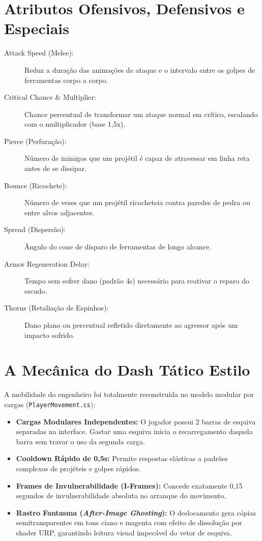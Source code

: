 \documentclass[a4paper,12pt]{report}
\begin{document}
\section{Atributos Ofensivos, Defensivos e Especiais}
\begin{description}
    \item[Attack Speed (Melee):] Reduz a duração das animações de ataque e o intervalo entre os golpes de ferramentas corpo a corpo.
    \item[Critical Chance \& Multiplier:] Chance percentual de transformar um ataque normal em crítico, escalando com o multiplicador (base 1,5x).
    \item[Pierce (Perfuração):] Número de inimigos que um projétil é capaz de atravessar em linha reta antes de se dissipar.
    \item[Bounce (Ricochete):] Número de vezes que um projétil ricocheteia contra paredes de pedra ou entre alvos adjacentes.
    \item[Spread (Dispersão):] Ângulo do cone de disparo de ferramentas de longo alcance.
    \item[Armor Regeneration Delay:] Tempo sem sofrer dano (padrão 4s) necessário para reativar o reparo do escudo.
    \item[Thorns (Retaliação de Espinhos):] Dano plano ou percentual refletido diretamente ao agressor após um impacto sofrido.
\end{description}

\section{A Mecânica do Dash Tático Estilo}
A mobilidade do engenheiro foi totalmente reconstruída no modelo modular por cargas (\texttt{PlayerMovement.cs}):
\begin{itemize}
    \item \textbf{Cargas Modulares Independentes:} O jogador possui 2 barras de esquiva separadas na interface. Gastar uma esquiva inicia o recarregamento daquela barra sem travar o uso da segunda carga.
    \item \textbf{Cooldown Rápido de 0,5s:} Permite respostas elásticas a padrões complexos de projéteis e golpes rápidos.
    \item \textbf{Frames de Invulnerabilidade (I-Frames):} Concede exatamente 0,15 segundos de invulnerabilidade absoluta no arranque do movimento.
    \item \textbf{Rastro Fantasma (\textit{After-Image Ghosting}):} O deslocamento gera cópias semitransparentes em tons ciano e magenta com efeito de dissolução por shader URP, garantindo leitura visual impecável do vetor de esquiva.
\end{itemize}
\end{document}
